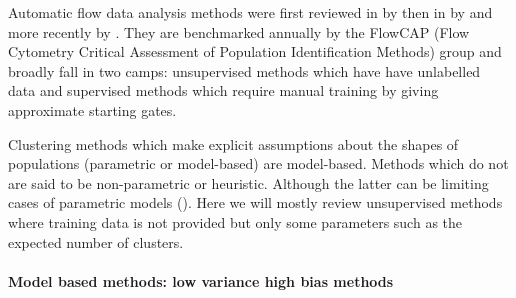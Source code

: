 Automatic flow data analysis methods were first reviewed in \citeyear{Bashashati:2009em} by \citeauthor{Bashashati:2009em} then in \citeyear{Lugli:2010ki} by \citeauthor{Lugli:2010ki}
and more recently by \citet{Aghaeepour:2013dg}.
They are benchmarked annually by the FlowCAP (Flow Cytometry Critical Assessment of Population Identification Methods)
group and broadly fall in two camps:
unsupervised methods which have have unlabelled data
and
supervised methods which require manual training by giving approximate starting gates.

Clustering methods which make explicit assumptions about the shapes of populations (parametric or model-based)
are model-based.
Methods which do not are said to be non-parametric or heuristic.
Although the latter can be limiting cases of parametric models ().
Here we will mostly review unsupervised methods where training data is not provided but only some parameters such as the expected
number of clusters.

\paragraph{Model based methods: low variance high bias methods}

